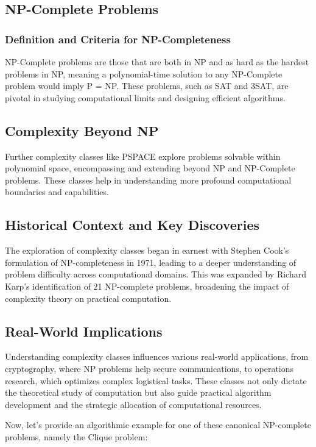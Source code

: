 \subsection{NP-Complete Problems}

\subsubsection{Definition and Criteria for NP-Completeness}
NP-Complete problems are those that are both in NP and as hard as the hardest problems in NP, meaning a polynomial-time solution to any NP-Complete problem would imply P = NP. These problems, such as SAT and 3SAT, are pivotal in studying computational limits and designing efficient algorithms.

\subsection{Complexity Beyond NP}

Further complexity classes like PSPACE explore problems solvable within polynomial space, encompassing and extending beyond NP and NP-Complete problems. These classes help in understanding more profound computational boundaries and capabilities.

\subsection{Historical Context and Key Discoveries}
The exploration of complexity classes began in earnest with Stephen Cook's formulation of NP-completeness in 1971, leading to a deeper understanding of problem difficulty across computational domains. This was expanded by Richard Karp’s identification of 21 NP-complete problems, broadening the impact of complexity theory on practical computation.

\subsection{Real-World Implications}
Understanding complexity classes influences various real-world applications, from cryptography, where NP problems help secure communications, to operations research, which optimizes complex logistical tasks. These classes not only dictate the theoretical study of computation but also guide practical algorithm development and the strategic allocation of computational resources.


Now, let's provide an algorithmic example for one of these canonical NP-complete problems, namely the Clique problem:

